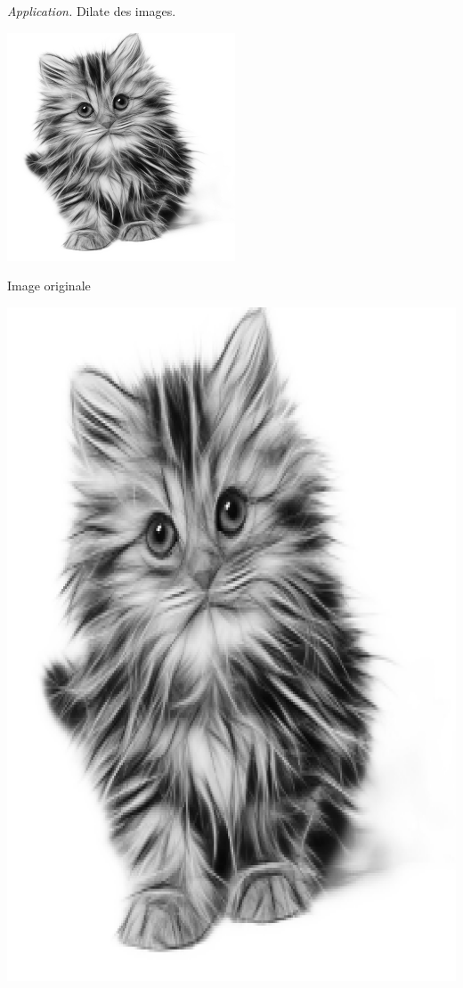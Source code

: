 \documentclass[11pt,class=report,crop=false]{standalone}
\begin{document}
\begin{activite}
\begin{enumerate}
	\emph{Application.} Dilate des images.
	\begin{center}
	\begin{minipage}{0.3\textwidth}\center
		\includegraphics[scale=\myscale,scale=0.18]{png/chat}
		
		Image originale
	\end{minipage}
	\begin{minipage}{0.45\textwidth}\center
		\includegraphics[scale=\myscale,scale=0.18]{png/chat_biho}
		

\end{minipage}
\end{center}
\end{enumerate}
\end{activite}
\end{document}
